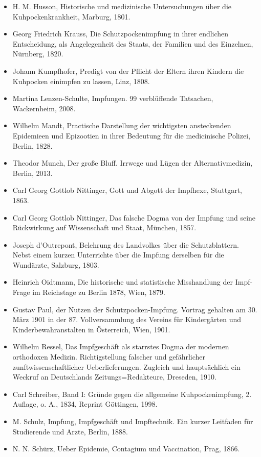 \documentclass[
    a4paper,
    12pt,
    hyphens,
    chapterprefix=true,
    headheight=33pt,
    footheight=29pt,
    headings=optiontohead, %
]{scrartcl}
\begin{document}
{\begin{itemize}
\item{H. M. Husson, Historische und medizinische Untersuchungen über die Kuhpockenkrankheit, Marburg, 1801.}
\item{Georg Friedrich Krauss, Die Schutzpockenimpfung in ihrer endlichen Entscheidung, als Angelegenheit des Staats, der Familien und des Einzelnen, Nürnberg, 1820.}
\item{Johann Kumpfhofer, Predigt von der Pflicht der Eltern ihren Kindern die Kuhpocken einimpfen zu lassen, Linz, 1808.}
\item{Martina Lenzen-Schulte, Impfungen. 99 verblüffende Tatsachen, Wackernheim, 2008.}
\item{Wilhelm Mandt, Practische Darstellung der wichtigsten ansteckenden Epidemieen und Epizootien in ihrer Bedeutung für die medicinische Polizei, Berlin, 1828.}
\item{Theodor Munch, Der große Bluff. Irrwege und Lügen der Alternativmedizin, Berlin, 2013.}
\item{Carl Georg Gottlob Nittinger, Gott und Abgott der Impfhexe, Stuttgart, 1863.}
\item{Carl Georg Gottlob Nittinger, Das falsche Dogma von der Impfung und seine Rückwirkung auf Wissenschaft und Staat, München, 1857.}
\item{Joseph d'Outrepont, Belehrung des Landvolkes über die Schutzblattern. Nebst einem kurzen Unterrichte über die Impfung derselben für die Wundärzte, Salzburg, 1803.}
\item{Heinrich Oidtmann, Die historische und statistische Misshandlung der Impf-Frage im Reichstage zu Berlin 1878, Wien, 1879.}
\item{Gustav Paul, der Nutzen der Schutzpocken-Impfung. Vortrag gehalten am 30. März 1901 in der 87. Vollversammlung des Vereins für Kindergärten und Kinderbewahranstalten in Österreich, Wien, 1901.}
\item{Wilhelm Ressel, Das Impfgeschäft als starrstes Dogma der modernen orthodoxen Medizin. Richtigstellung falscher und gefährlicher zunftwissenschaftlicher Ueberlieferungen. Zugleich und hauptsächlich ein Weckruf an Deutschlands Zeitungs=Redakteure, Dreseden, 1910.}
\item{Carl Schreiber, Band I: Gründe gegen die allgemeine Kuhpockenimpfung, 2. Auflage, o. A., 1834, Reprint Göttingen, 1998.}
\item{M. Schulz, Impfung, Impfgeschäft und Impftechnik. Ein kurzer Leitfaden für Studierende und Arzte, Berlin, 1888.}
\item{N. N. Schürz, Ueber Epidemie, Contagium und Vaccination, Prag, 1866.}

\end{itemize}}
\end{document}
